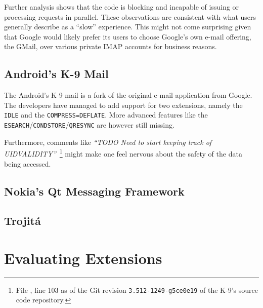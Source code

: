 \documentclass[trojita]{subfiles}
\begin{document}
Further analysis shows that the code is blocking and incapable of issuing or processing requests in parallel.  These
observations are consistent with what users generally describe as a ``slow'' experience.  This might not come surprising
given that Google would likely prefer its users to choose Google's own e-mail offering, the GMail, over various private
IMAP accounts for business reasons.

\subsection{Android's K-9 Mail}

The Android's K-9 mail is a fork of the original e-mail application from Google.  The developers have managed to add
support for two extensions, namely the {\tt IDLE} and the {\tt COMPRESS=DEFLATE}.  More advanced features like the {\tt
ESEARCH}/{\tt CONDSTORE}/{\tt QRESYNC} are however still missing.

Furthermore, comments like {\em ``TODO Need to start keeping track of UIDVALIDITY''}~\footnote{File
, line 103 as of the Git revision {\tt 3.512-1249-g5ce0e19} of the K-9's
source code repository.} might make one feel nervous about the safety of the data being accessed.

\subsection{Nokia's Qt Messaging Framework}


\subsection{Trojitá}


\section{Evaluating Extensions}
\end{document}
